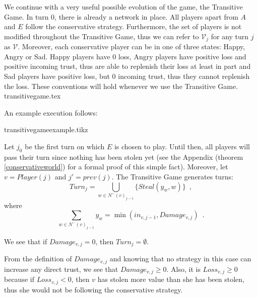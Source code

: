    We continue with a very useful possible evolution of the game, the Transitive Game. In turn 0, there is already a network
   in place. All players apart from $A$ and $E$ follow the conservative strategy. Furthermore, the set of players is not
   modified throughout the Transitive Game, thus we can refer to $\mathcal{V}_j$ for any turn $j$ as $\mathcal{V}$.
   Moreover, each conservative player can be in one of three states: Happy, Angry or Sad. Happy players have 0 loss, Angry
   players have positive loss and positive incoming trust, thus are able to replenish their loss at least in part and
   Sad players have positive loss, but 0 incoming trust, thus they cannot replenish the loss. These conventions will hold
   whenever we use the Transitive Game.
   {transitivegame.tex}

   An example execution follows:

   {transitivegameexample.tikz}

   Let $j_0$ be the first turn on which $E$ is chosen to play. Until then, all players will pass their turn since nothing
   has been stolen yet (see the Appendix (theorem \ref{conservativeworld}) for a formal proof of this simple fact).
   Moreover, let $v = Player(j)$ and $j' = prev\left(j\right)$.
   The Transitive Game generates turns:
   \begin{equation}
      Turn_j = \bigcup\limits_{w \in N^{-}\left(v\right)_{j-1}}\{Steal\left(y_w,w\right)\} \enspace,
   \end{equation}
   where
   \begin{equation*}
      \sum\limits_{w \in N^{-}\left(v\right)_{j-1}}y_w = \min\left(in_{v, j-1}, Damage_{v, j}\right) \enspace.
   \end{equation*}
 
   We see that if $Damage_{v, j} = 0$, then $Turn_j = \emptyset$.

   From the definition of $Damage_{v,j}$ and knowing that no strategy in this case can increase any direct trust, we see
   that $Damage_{v,j} \geq 0$. Also, it is $Loss_{v,j} \geq 0$ because if $Loss_{v,j} < 0$, then $v$ has
   stolen more value than she has been stolen, thus she would not be following the conservative strategy.
